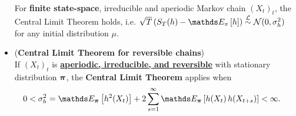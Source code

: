 \documentclass[11pt]{article}
\begin{document}
\begin{itemize}
\begin{corollary}\citep{liu2001monte}\\
For \textbf{finite state-space}, irreducible and aperiodic Markov chain $(X_t)_t$, the Central Limit Theorem holds, i.e. $\sqrt{T}\paren{S_T(h) - \E{\pi}{h}} \stackrel{\cL}{\sim} \cN(0, \sigma_{h}^2)$ for any initial distribution $\mu$.
\end{corollary}

\item \begin{theorem} (\textbf{Central Limit Theorem for reversible chains})\\
If $(X_t)_t$ is \underline{\textbf{aperiodic, irreducible, and reversible}} with stationary distribution $\boldsymbol{\pi}$, the \textbf{Central Limit Theorem} applies when
\begin{align}
0< \sigma_{h}^2 &= \E{\mb{\pi}}{h^2(X_t)} + 2\sum_{s=1}^{\infty}\E{\mb{\pi}}{h(X_t)\, h(X_{t+s})} < \infty. \label{eqn: mc_asym_variance}
\end{align}
\end{theorem}

%
\end{itemize}

\newpage


\end{document}
